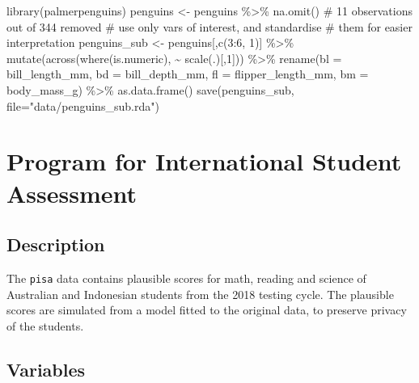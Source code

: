 \documentclass[
  letterpaper,
]{book}
\newenvironment{Shaded}{\begin{snugshade}}{\end{snugshade}}
\newcommand{\AttributeTok}[1]{\textcolor[rgb]{0.40,0.45,0.13}{#1}}
\newcommand{\CommentTok}[1]{\textcolor[rgb]{0.37,0.37,0.37}{#1}}
\newcommand{\DecValTok}[1]{\textcolor[rgb]{0.68,0.00,0.00}{#1}}
\newcommand{\FunctionTok}[1]{\textcolor[rgb]{0.28,0.35,0.67}{#1}}
\newcommand{\NormalTok}[1]{\textcolor[rgb]{0.00,0.23,0.31}{#1}}
\newcommand{\OtherTok}[1]{\textcolor[rgb]{0.00,0.23,0.31}{#1}}
\newcommand{\SpecialCharTok}[1]{\textcolor[rgb]{0.37,0.37,0.37}{#1}}
\newcommand{\StringTok}[1]{\textcolor[rgb]{0.13,0.47,0.30}{#1}}
\begin{document}
\begin{Shaded}
\begin{Highlighting}[]
\FunctionTok{library}\NormalTok{(palmerpenguins)}
\NormalTok{penguins }\OtherTok{\textless{}{-}}\NormalTok{ penguins }\SpecialCharTok{\%\textgreater{}\%}
  \FunctionTok{na.omit}\NormalTok{() }\CommentTok{\# 11 observations out of 344 removed}
\CommentTok{\# use only vars of interest, and standardise}
\CommentTok{\# them for easier interpretation}
\NormalTok{penguins\_sub }\OtherTok{\textless{}{-}}\NormalTok{ penguins[,}\FunctionTok{c}\NormalTok{(}\DecValTok{3}\SpecialCharTok{:}\DecValTok{6}\NormalTok{, }\DecValTok{1}\NormalTok{)] }\SpecialCharTok{\%\textgreater{}\%} 
  \FunctionTok{mutate}\NormalTok{(}\FunctionTok{across}\NormalTok{(}\FunctionTok{where}\NormalTok{(is.numeric),  }\SpecialCharTok{\textasciitilde{}} \FunctionTok{scale}\NormalTok{(.)[,}\DecValTok{1}\NormalTok{])) }\SpecialCharTok{\%\textgreater{}\%}
  \FunctionTok{rename}\NormalTok{(}\AttributeTok{bl =}\NormalTok{ bill\_length\_mm,}
         \AttributeTok{bd =}\NormalTok{ bill\_depth\_mm,}
         \AttributeTok{fl =}\NormalTok{ flipper\_length\_mm,}
         \AttributeTok{bm =}\NormalTok{ body\_mass\_g) }\SpecialCharTok{\%\textgreater{}\%}
  \FunctionTok{as.data.frame}\NormalTok{()}
\FunctionTok{save}\NormalTok{(penguins\_sub, }\AttributeTok{file=}\StringTok{"data/penguins\_sub.rda"}\NormalTok{)}
\end{Highlighting}
\end{Shaded}

\hypertarget{program-for-international-student-assessment}{%
\section{Program for International Student
Assessment}\label{program-for-international-student-assessment}}

\hypertarget{description-4}{%
\subsection*{Description}\label{description-4}}

The \texttt{pisa} data contains plausible scores for math, reading and
science of Australian and Indonesian students from the 2018 testing
cycle. The plausible scores are simulated from a model fitted to the
original data, to preserve privacy of the students.

\hypertarget{variables-4}{%
\subsection*{Variables}\label{variables-4}}
\end{document}
